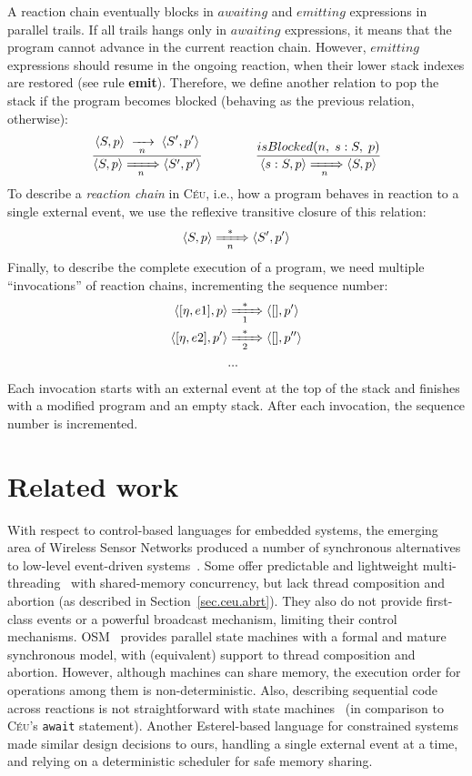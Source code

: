 \documentclass{acm_proc_article-sp}
\newcommand{\CEU}{\textsc{C\'{e}u}\xspace}
\newcommand{\code}[1] {{\small{\texttt{#1}}}}
\newcommand{\ST}{\1\xrightarrow[~n~]{}\1}
\newcommand{\LL}{\langle}
\newcommand{\RR}{\rangle}
\newcommand{\DS}{\displaystyle}
\newcommand{\rr}[1] {{\textbf{\scriptsize{#1}}}}
\newcommand{\1}{\;}
\newcommand{\2}{\;\;}
\newcommand{\3}{\;\;\;}
\newcommand{\5}{\;\;\;\;\;}
\begin{document}
A reaction chain eventually blocks in $awaiting$ and $emitting$ expressions in 
parallel trails.
%
If all trails hangs only in $awaiting$ expressions, it means that the program 
cannot advance in the current reaction chain.
%
However, $emitting$ expressions should resume in the ongoing reaction, when 
their lower stack indexes are restored (see rule \rr{emit}).
%
Therefore, we define another relation to pop the stack if the program becomes 
blocked (behaving as the previous relation, otherwise):
%
$$
\frac
    { \DS \LL S,p \RR \ST                   \LL S',p' \RR }
    {     \LL S,p \RR \xRightarrow[~~n~~]{} \LL S',p' \RR }
%
\5\5\5
%
\frac
    { \DS isBlocked(n,\1s:S,\1p) }
    { \LL s:S,p \RR \xRightarrow[~~n~~]{} \LL S,p \RR }
$$
%
To describe a \emph{reaction chain} in \CEU, i.e., how a program behaves in 
reaction to a single external event, we use the reflexive transitive closure of 
this relation:
%
$$
    \LL S,p \RR \xRightarrow[~~n~~]{*} \LL S',p' \RR
$$
%
Finally, to describe the complete execution of a program, we need multiple 
``invocations'' of reaction chains, incrementing the sequence number:
%
\begin{align*}
\LL [\eta,e1], p \RR
    & \xRightarrow[~~1~~]{*}
\LL [  ], p' \RR
\\
\LL [\eta,e2], p' \RR
    & \xRightarrow[~~2~~]{*}
\LL [  ], p'' \RR
\\
& ...
\end{align*}
%
Each invocation starts with an external event at the top of the stack and 
finishes with a modified program and an empty stack.
After each invocation, the sequence number is incremented.

\section{Related work}
\label{sec.related}

With respect to control-based languages for embedded systems, the emerging area 
of Wireless Sensor Networks produced a number of synchronous alternatives to 
low-level event-driven systems~\cite{wsn.protothreads,wsn.sol,wsn.osm}. 
%
Some offer predictable and lightweight
multi-threading~\cite{wsn.protothreads} with shared-memory concurrency, but 
lack thread composition and abortion (as described in 
Section~\ref{sec.ceu.abrt}).
They also do not provide first-class events or a powerful broadcast mechanism, 
limiting their control mechanisms.
%
OSM~\cite{wsn.osm} provides parallel state machines with a formal and mature 
synchronous model, with (equivalent) support to thread composition and 
abortion.
However, although machines can share memory, the execution order for operations 
among them is non-deterministic.
Also, describing sequential code across reactions is not straightforward with 
state machines~\cite{wsn.osm} (in comparison to \CEU's \code{await} statement).
%
Another Esterel-based language for constrained systems~\cite{wsn.sol} made 
similar design decisions to ours, handling a single external event at a time, 
and relying on a deterministic scheduler for safe memory sharing.
\end{document}

